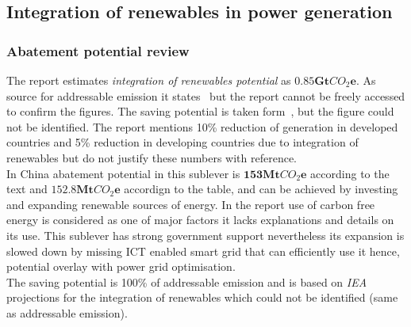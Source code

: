 \documentclass[11pt, twocolumn]{article}
\begin{document}
\subsection{Integration of renewables in power generation}
\subsubsection{Abatement potential review}
The report estimates \emph{integration of renewables potential} as $\mathbf{0.85Gt}CO_2\mathbf{e}$. As source for addressable emission it states~\citep{iea:etp} but the report cannot be freely accessed to confirm the figures. The saving potential is taken form~\citep{webb2008smart}, but the figure could not be identified. The report mentions 10\% reduction of generation in developed countries and 5\% reduction in developing countries due to integration of renewables but do not justify these numbers with reference.\\

In China abatement potential in this sublever is $\mathbf{153} \mathbf{Mt}CO_2\mathbf{e}$ according to the text and $\mathbf{152.8} \mathbf{Mt}CO_2\mathbf{e}$ accordign to the table, and can be achieved by investing and expanding renewable sources of energy. In the report use of carbon free energy is considered as one of major factors it lacks explanations and details on its use. This sublever has strong government support nevertheless its expansion is slowed down by missing ICT enabled smart grid that can efficiently use it hence, potential overlay with power grid optimisation.\\
The saving potential is 100\% of addressable emission and is based on \emph{IEA} projections for the integration of renewables which could not be identified (same as addressable emission).\\
\end{document}
